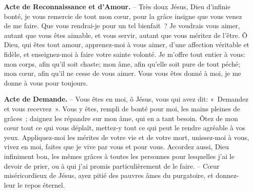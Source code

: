 \textbf{Acte de Reconnaissance et d’Amour.} – Très doux Jésus, Dieu d’infinie bonté, je vous remercie de tout mon cœur, pour la grâce insigne que vous venez de me faire. Que vous rendrai-je pour un tel bienfait~? Je voudrais vous aimer, autant que vous êtes aimable, et vous servir, autant que vous méritez de l’être. Ô Dieu, qui êtes tout amour, apprenez-moi à vous aimer, d’une affection véritable et fidèle, et enseignez-moi à faire votre sainte volonté. Je m’offre tout entier à vous: mon corps, afin qu’il soit chaste; mon âme, afin qu’elle soit pure de tout péché; mon cœur, afin qu’il ne cesse de vous aimer. Vous vous êtes donné à moi, je me donne à vous pour toujours.

\textbf{Acte de Demande.} – Vous êtes en moi, ô Jésus, vous qui avez dit: «~Demandez et vous recevrez~». Vous y êtes, rempli de bonté pour moi, les mains pleines de grâces~; daignez les répandre sur mon âme, qui en a tant besoin. Ôtez de mon cœur tout ce qui vous déplaît, mettez-y tout ce qui peut le rendre agréable à vos yeux. Appliquez-moi les mérites de votre vie et de votre mort, unissez-moi à vous, vivez en moi, faites que je vive par vous et pour vous. Accordez aussi, Dieu infiniment bon, les mêmes grâces à toutes les personnes pour lesquelles j’ai le devoir de prier, ou à qui j’ai promis particulièrement de le faire. – Cœur miséricordieux de Jésus, ayez pitié des pauvres âmes du purgatoire, et donnez-leur le repos éternel.





